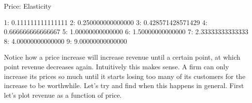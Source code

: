 \documentclass[letterpaper,10pt,english]{jupyterBook}
\begin{document}
\begin{sphinxVerbatim}[commandchars=\\\{\}]
 
     

  
  
  \PYG{p}{[}    \PYG{p}{]}


   
     
\end{sphinxVerbatim}

\begin{sphinxVerbatim}[commandchars=\\\{\}]
Price: Elasticity

1: 0.111111111111111
2: 0.250000000000000
3: 0.428571428571429
4: 0.666666666666667
5: 1.00000000000000
6: 1.50000000000000
7: 2.33333333333333
8: 4.00000000000000
9: 9.00000000000000
\end{sphinxVerbatim}

\sphinxAtStartPar
Notice how a price increase will increase revenue until a certain point, at which point revenue decreases again. Intuitively this makes sense. A firm can only increase its prices so much until it starts losing too many of its customers for the increase to be worthwhile. Let’s try and find when this happens in general. First let’s plot revenue as a function of price.
\end{document}
